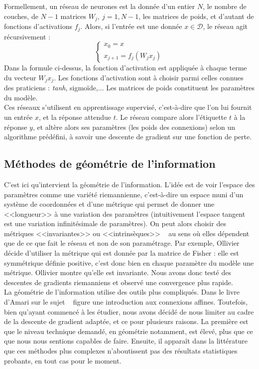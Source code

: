 \documentclass{article}
\begin{document}
Formellement, un réseau de neurones est la donnée d'un entier $N$, le nombre de couches, de $N-1$ matrices $W_j, \ j=1,N-1$, les matrices de poids, et d'autant de fonctions d'activations $f_j$.  Alors, si l'entrée est une donnée $x\in \mathcal D$, le réseau agit récursivement :
\[\left\{\begin{array}{c}x_0=x\\ x_{j+1}=f_j(W_j x_j)\end{array}\right.\]
Dans la formule ci-dessus, la fonction d'activation est appliquée à chaque terme du vecteur $W_j x_j$. Les fonctions d'activation sont à choisir parmi celles connues des praticiens : \textit{tanh}, sigmoïde,... Les matrices de poids constituent les paramètres du modèle.\\

Ces réseaux s'utilisent en apprentissage supervisé, c'est-à-dire que l'on lui fournit un entrée $x$, et la réponse attendue $t$. Le réseau compare alors l'étiquette $t$ à la réponse $y$, et altère alors ses paramètres (les poids des connexions) selon un algorithme prédéfini, à savoir une descente de gradient sur une fonction de perte.\\

\subsection{Méthodes de géométrie de l'information}
C'est ici qu'intervient la géométrie de l'information. L'idée est de voir l'espace des paramètres comme une variété riemannienne, c'est-à-dire un espace muni d'un système de coordonnées et d'une métrique qui permet de donner une <<longueur>> à une variation des paramètres (intuitivement l'espace tangent est une variation infinitésimale de paramètres). On peut alors choisir des métriques <<invariantes>> ou <<intrinsèques>> ~\cite{Ollivier} au sens où elles dépendent que de ce que fait le réseau et non de son paramétrage. Par exemple, Ollivier décide d'utiliser la métrique qui est donnée par la matrice de Fisher : elle est symmétrique définie positive, c'est donc bien en chaque paramètre du modèle une métrique. Ollivier montre qu'elle est invariante. Nous avons donc testé des descentes de gradients riemanniens et observé une convergence plus rapide.\\

La géométrie de l'information utilise des outils plus compliqués. Dans le livre d'Amari sur le sujet ~\cite{Amari} figure une introduction aux connexions affines. Toutefois, bien qu'ayant commencé à les étudier, nous avons décidé de nous limiter au cadre de la descente de gradient adaptée, et ce pour plusieurs raisons. La première est que le niveau technique demandé, en géométrie notamment, est élevé, plus que ce que nous nous sentions capables de faire. Ensuite, il apparaît dans la littérature que ces méthodes plus complexes n'aboutissent pas des résultats statistiques probants, en tout cas pour le moment. \\
\end{document}
